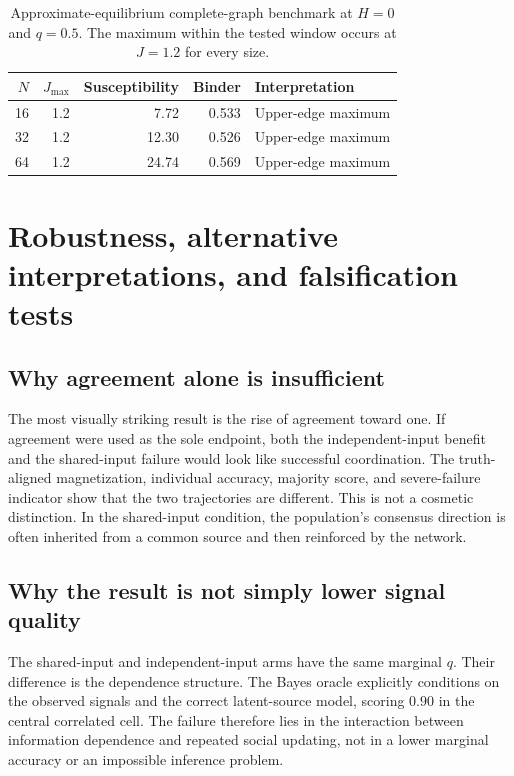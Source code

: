\documentclass[11pt,a4paper]{article}
\begin{document}
\begin{table}[htbp]
\centering
\caption{Approximate-equilibrium complete-graph benchmark at $H=0$ and $q=0.5$. The maximum within the tested window occurs at $J=1.2$ for every size.}
\label{tab:critical}
\small
\begin{tabular}{@{}rrrrl@{}}
\toprule
$N$ & $J_{\mathrm{max}}$ & Susceptibility & Binder & Interpretation \\
\midrule
16 & 1.2 & 7.72 & 0.533 & Upper-edge maximum \\
32 & 1.2 & 12.30 & 0.526 & Upper-edge maximum \\
64 & 1.2 & 24.74 & 0.569 & Upper-edge maximum \\
\bottomrule
\end{tabular}
\end{table}

\section{Robustness, alternative interpretations, and falsification tests}

\subsection{Why agreement alone is insufficient}

The most visually striking result is the rise of agreement toward one. If agreement were used as the sole endpoint, both the independent-input benefit and the shared-input failure would look like successful coordination. The truth-aligned magnetization, individual accuracy, majority score, and severe-failure indicator show that the two trajectories are different. This is not a cosmetic distinction. In the shared-input condition, the population's consensus direction is often inherited from a common source and then reinforced by the network.

\subsection{Why the result is not simply lower signal quality}

The shared-input and independent-input arms have the same marginal $q$. Their difference is the dependence structure. The Bayes oracle explicitly conditions on the observed signals and the correct latent-source model, scoring $0.90$ in the central correlated cell. The failure therefore lies in the interaction between information dependence and repeated social updating, not in a lower marginal accuracy or an impossible inference problem.
\end{document}
